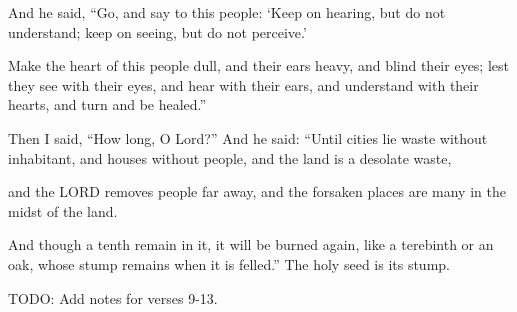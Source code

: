 \documentclass[11pt]{article}
\begin{document}
\begin{biblicaloutline}[Isaiah 6:9-13]
    

    \begin{versesection}{2em}
         And he said, ``Go, and say to this people: `Keep on hearing, but do not understand; keep on seeing, but do not perceive.'

         Make the heart of this people dull, and their ears heavy, and blind their eyes; lest they see with their eyes, and hear with their ears, and understand with their hearts, and turn and be healed.''
    \end{versesection}
    
    
    \begin{versesection}{2em}
         Then I said, ``How long, O Lord?'' And he said: ``Until cities lie waste without inhabitant, and houses without people, and the land is a desolate waste,

         and the LORD removes people far away, and the forsaken places are many in the midst of the land.

         And though a tenth remain in it, it will be burned again, like a terebinth or an oak, whose stump remains when it is felled.'' The holy seed is its stump.
    \end{versesection}

\end{biblicaloutline}

{\vspace{2em}}
TODO: Add notes for verses 9-13.
\end{document}
